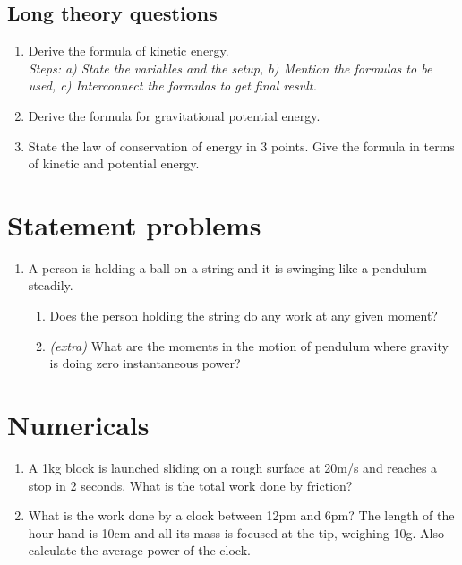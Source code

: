 \documentclass[12pt]{article}
\begin{document}
\subsection*{Long theory questions}
\begin{enumerate}
	\item Derive the formula of kinetic energy. \\ \textit{Steps: a) State the variables and the setup, b) Mention the formulas to be used, c) Interconnect the formulas to get final result.}
	\item Derive the formula for gravitational potential energy.
	\item State the law of conservation of energy in 3 points. Give the formula in terms of kinetic and potential energy.
\end{enumerate}

\section*{Statement problems}
\begin{enumerate}
	\item A person is holding a ball on a string and it is swinging like a pendulum steadily. 
	\begin{enumerate}
		\item Does the person holding the string do any work at any given moment? 
		\item \textit{(extra)} What are the moments in the motion of pendulum where gravity is doing zero instantaneous power?
	\end{enumerate}
\end{enumerate}

\section*{Numericals}
\begin{enumerate}
	\item A 1kg block is launched sliding on a rough surface at 20m/s and reaches a stop in 2 seconds. What is the total work done by friction? 
	\item What is the work done by a clock between 12pm and 6pm? The length of the hour hand is 10cm and all its mass is focused at the tip, weighing 10g. Also calculate the average power of the clock.
\end{enumerate}
\end{document}
